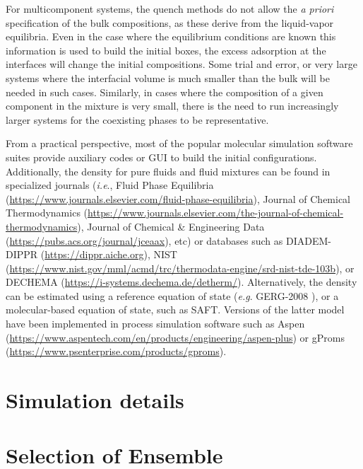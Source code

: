 \documentclass{scrbook}
\begin{document}
For multicomponent systems, the quench methods do not allow the \textit{a
priori} specification of the bulk compositions, as these derive from the
liquid-vapor equilibria. Even in the case where the equilibrium conditions are
known this information is used to build the initial boxes, the excess
adsorption at the interfaces will change the initial compositions. Some trial
and error, or very large systems where the interfacial volume is much smaller
than the bulk will be needed in such cases. Similarly, in cases where the
composition of a given component in the mixture is very small, there is the
need to run increasingly larger systems for the coexisting phases to be
representative.

From a practical perspective, most of the popular molecular simulation software
suites provide auxiliary codes or GUI to build the initial configurations.
Additionally, the density for pure fluids and fluid mixtures can be found in
specialized journals (\textit{i.e}., Fluid Phase Equilibria (\url{https://www.journals.elsevier.com/fluid-phase-equilibria}),
Journal of Chemical Thermodynamics (\url{https://www.journals.elsevier.com/the-journal-of-chemical-thermodynamics}),
Journal of Chemical \& Engineering Data (\url{https://pubs.acs.org/journal/jceaax}),
etc)
or databases such as DIADEM-DIPPR (\url{https://dippr.aiche.org}),
NIST \citep{lemmon2013} (\url{https://www.nist.gov/mml/acmd/trc/thermodata-engine/srd-nist-tde-103b}),
or DECHEMA (\url{https://i-systems.dechema.de/detherm/}).
Alternatively, the density can be estimated using a reference equation of state
(\textit{e.g}. GERG-2008 \citep{kunz2012}),
or a molecular-based equation of
state, such as SAFT\citep{lafitte2013}.
Versions of the latter model have been implemented in process simulation
software such as Aspen (\url{https://www.aspentech.com/en/products/engineering/aspen-plus})
or gProms (\url{https://www.psenterprise.com/products/gproms}).

\chapter{Simulation details}

\chapter{Selection of Ensemble}
\end{document}
